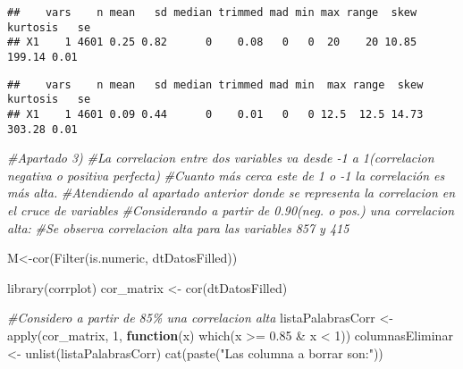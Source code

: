 \documentclass[
]{article}
\newenvironment{Shaded}{\begin{snugshade}}{\end{snugshade}}
\newcommand{\CommentTok}[1]{\textcolor[rgb]{0.56,0.35,0.01}{\textit{#1}}}
\newcommand{\ControlFlowTok}[1]{\textcolor[rgb]{0.13,0.29,0.53}{\textbf{#1}}}
\newcommand{\DecValTok}[1]{\textcolor[rgb]{0.00,0.00,0.81}{#1}}
\newcommand{\FloatTok}[1]{\textcolor[rgb]{0.00,0.00,0.81}{#1}}
\newcommand{\FunctionTok}[1]{\textcolor[rgb]{0.00,0.00,0.00}{#1}}
\newcommand{\NormalTok}[1]{#1}
\newcommand{\OtherTok}[1]{\textcolor[rgb]{0.56,0.35,0.01}{#1}}
\newcommand{\SpecialCharTok}[1]{\textcolor[rgb]{0.00,0.00,0.00}{#1}}
\newcommand{\StringTok}[1]{\textcolor[rgb]{0.31,0.60,0.02}{#1}}
\begin{document}
\begin{verbatim}
##    vars    n mean   sd median trimmed mad min max range  skew kurtosis   se
## X1    1 4601 0.25 0.82      0    0.08   0   0  20    20 10.85   199.14 0.01
\end{verbatim}

\begin{Shaded}
\end{Shaded}

\begin{verbatim}
##    vars    n mean   sd median trimmed mad min  max range  skew kurtosis   se
## X1    1 4601 0.09 0.44      0    0.01   0   0 12.5  12.5 14.73   303.28 0.01
\end{verbatim}

\begin{Shaded}
\begin{Highlighting}[]
  \CommentTok{\#Apartado 3)}
  \CommentTok{\#La correlacion entre dos variables va desde {-}1 a 1(correlacion negativa o positiva perfecta)}
  \CommentTok{\#Cuanto más cerca este de 1 o {-}1 la correlación es más alta.}
  \CommentTok{\#Atendiendo al apartado anterior donde se representa la correlacion en el cruce de variables}
  \CommentTok{\#Considerando a partir de 0.90(neg. o pos.) una correlacion alta:}
  \CommentTok{\#Se observa correlacion alta para las variables 857 y 415}

\NormalTok{  M}\OtherTok{\textless{}{-}}\FunctionTok{cor}\NormalTok{(}\FunctionTok{Filter}\NormalTok{(is.numeric, dtDatosFilled))}
  
  \FunctionTok{library}\NormalTok{(corrplot)}
\NormalTok{  cor\_matrix }\OtherTok{\textless{}{-}} \FunctionTok{cor}\NormalTok{(dtDatosFilled)}
  
  \CommentTok{\#Considero a partir de 85\% una correlacion alta}
\NormalTok{  listaPalabrasCorr }\OtherTok{\textless{}{-}} \FunctionTok{apply}\NormalTok{(cor\_matrix, }\DecValTok{1}\NormalTok{, }\ControlFlowTok{function}\NormalTok{(x) }\FunctionTok{which}\NormalTok{(x }\SpecialCharTok{\textgreater{}=} \FloatTok{0.85} \SpecialCharTok{\&}\NormalTok{ x }\SpecialCharTok{\textless{}} \DecValTok{1}\NormalTok{))}
\NormalTok{  columnasEliminar }\OtherTok{\textless{}{-}} \FunctionTok{unlist}\NormalTok{(listaPalabrasCorr)}
  \FunctionTok{cat}\NormalTok{(}\FunctionTok{paste}\NormalTok{(}\StringTok{"Las columna a borrar son:"}\NormalTok{))}
\end{Highlighting}
\end{Shaded}
\end{document}
